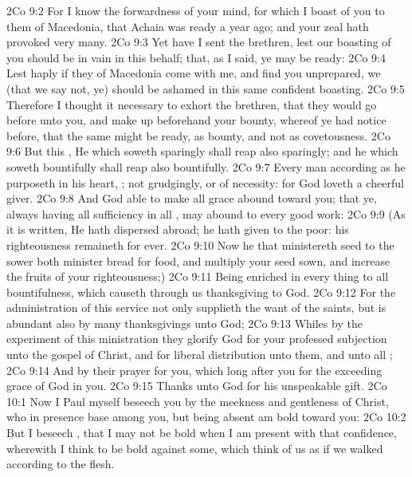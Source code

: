 \vs 2Co 9:2 For I know the forwardness of your mind, for which I boast of you to them of Macedonia, that Achaia was ready a year ago; and your zeal hath provoked very many.
\vs 2Co 9:3 Yet have I sent the brethren, lest our boasting of you should be in vain in this behalf; that, as I said, ye may be ready:
\vs 2Co 9:4 Lest haply if they of Macedonia come with me, and find you unprepared, we (that we say not, ye) should be ashamed in this same confident boasting.
\vs 2Co 9:5 Therefore I thought it necessary to exhort the brethren, that they would go before unto you, and make up beforehand your bounty, whereof ye had notice before, that the same might be ready, as  bounty, and not as  covetousness.
\vs 2Co 9:6 But this , He which soweth sparingly shall reap also sparingly; and he which soweth bountifully shall reap also bountifully.
\vs 2Co 9:7 Every man according as he purposeth in his heart, ; not grudgingly, or of necessity: for God loveth a cheerful giver.
\vs 2Co 9:8 And God  able to make all grace abound toward you; that ye, always having all sufficiency in all , may abound to every good work:
\vs 2Co 9:9 (As it is written, He hath dispersed abroad; he hath given to the poor: his righteousness remaineth for ever.
\vs 2Co 9:10 Now he that ministereth seed to the sower both minister bread for  food, and multiply your seed sown, and increase the fruits of your righteousness;)
\vs 2Co 9:11 Being enriched in every thing to all bountifulness, which causeth through us thanksgiving to God.
\vs 2Co 9:12 For the administration of this service not only supplieth the want of the saints, but is abundant also by many thanksgivings unto God;
\vs 2Co 9:13 Whiles by the experiment of this ministration they glorify God for your professed subjection unto the gospel of Christ, and for  liberal distribution unto them, and unto all ;
\vs 2Co 9:14 And by their prayer for you, which long after you for the exceeding grace of God in you.
\vs 2Co 9:15 Thanks  unto God for his unspeakable gift.
\vs 2Co 10:1 Now I Paul myself beseech you by the meekness and gentleness of Christ, who in presence  base among you, but being absent am bold toward you:
\vs 2Co 10:2 But I beseech , that I may not be bold when I am present with that confidence, wherewith I think to be bold against some, which think of us as if we walked according to the flesh.
